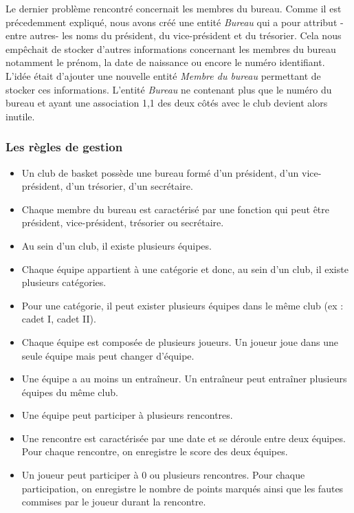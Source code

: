\documentclass{article}
\begin{document}
Le dernier problème rencontré concernait les membres du bureau. Comme il est précedemment expliqué, nous avons créé une entité \textit{Bureau} qui a pour attribut -entre autres- les noms du président, du vice-président et du trésorier. Cela nous empêchait de stocker d'autres informations concernant les membres du bureau notamment le prénom, la date de naissance ou encore le numéro identifiant. L'idée était d'ajouter une nouvelle entité \textit{Membre du bureau} permettant de stocker ces informations. L'entité \textit{Bureau} ne contenant plus que le numéro du bureau et ayant une association 1,1 des deux côtés avec le club devient alors inutile.  

\subsubsection*{Les règles de gestion}
\begin{itemize}
\item Un club de basket possède une bureau formé d'un président, d'un vice-président, d'un trésorier, d'un secrétaire.  \\


\item Chaque membre du bureau est caractérisé par une fonction qui peut être président, vice-président, trésorier ou secrétaire. \\


\item Au sein d'un club, il existe plusieurs équipes. \\


\item Chaque équipe appartient à une catégorie et donc, au sein d'un club, il existe plusieurs catégories.  \\


\item Pour une catégorie, il peut exister plusieurs équipes dans le même club (ex : cadet I, cadet II). \\


\item Chaque équipe est composée de plusieurs joueurs. Un joueur joue dans une seule équipe mais peut changer d'équipe. \\


\item Une équipe a au moins un entraîneur. Un entraîneur peut entraîner plusieurs équipes du même club. \\


\item Une équipe peut participer à plusieurs rencontres. \\


\item Une rencontre est caractérisée par une date et se déroule entre deux équipes. Pour chaque rencontre, on enregistre le score des deux équipes. \\


\item Un joueur peut participer à 0 ou plusieurs rencontres. Pour chaque participation, on enregistre le nombre de points marqués ainsi que les fautes commises par le joueur durant la rencontre. \\
\end{itemize}
\end{document}
